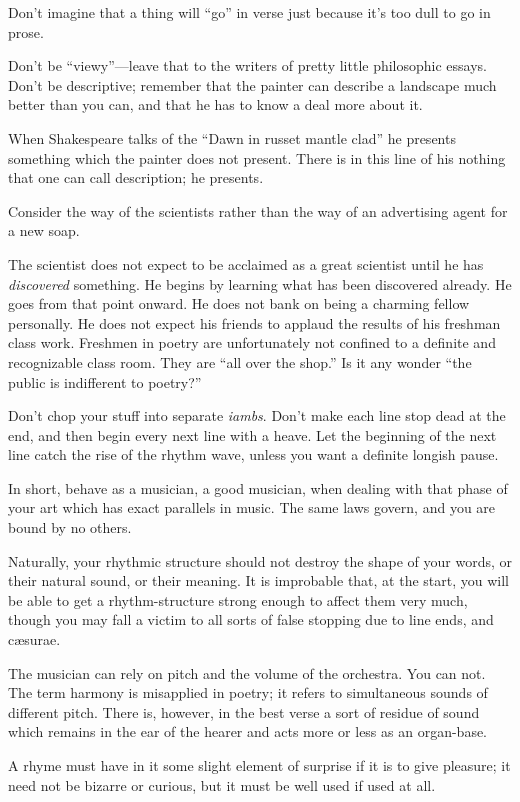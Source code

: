 Don't imagine that a thing will ``go'' in verse just because it's too
dull to go in prose.

Don't be ``viewy''---leave that to the writers of pretty little
philosophic essays. Don't be descriptive; remember that the painter can
describe a landscape much better than you can, and that he has to know a
deal more about it.

When Shakespeare talks of the ``Dawn in russet mantle clad'' he presents
something which the painter does not present. There is in this line of
his nothing that one can call description; he presents.

Consider the way of the scientists rather than the way of an advertising
agent for a new soap.

The scientist does not expect to be acclaimed as a great scientist until
he has \emph{discovered} something. He begins by learning what has been
discovered already. He goes from that point onward. He does not bank on
being a charming fellow personally. He does not expect his friends to
applaud the results of his freshman class work. Freshmen in poetry are
unfortunately not confined to a definite and recognizable class room.
They are ``all over the shop.'' Is it any wonder ``the public is
indifferent to poetry?''

Don't chop your stuff into separate \emph{iambs}. Don't make each line
stop dead at the end, and then begin every next line with a heave. Let
the beginning of the next line catch the rise of the rhythm wave, unless
you want a definite longish pause.

In short, behave as a musician, a good musician, when dealing with that
phase of your art which has exact parallels in music. The same laws
govern, and you are bound by no others.

Naturally, your rhythmic structure should not destroy the shape of your
words, or their natural sound, or their meaning. It is improbable that,
at the start, you will be able to get a rhythm-structure strong enough
to affect them very much, though you may fall a victim to all sorts of
false stopping due to line ends, and cæsurae.

The musician can rely on pitch and the volume of the orchestra. You can
not. The term harmony is misapplied in poetry; it refers to simultaneous
sounds of different pitch. There is, however, in the best verse a sort
of residue of sound which remains in the ear of the hearer and acts more
or less as an organ-base.

A rhyme must have in it some slight element of surprise if it is to give
pleasure; it need not be bizarre or curious, but it must be well used if
used at all.

